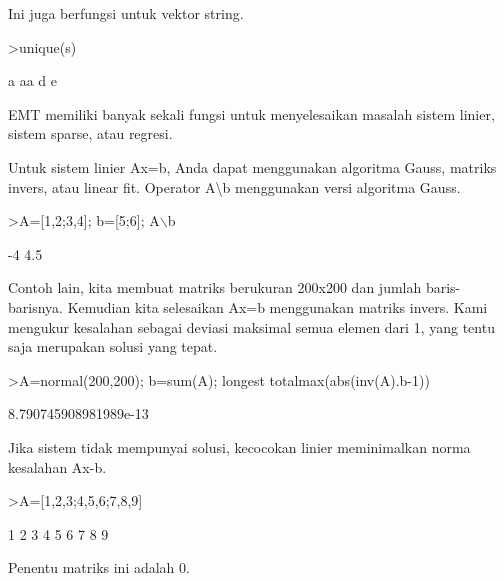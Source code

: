 \documentclass[a4paper,10pt]{article}
\begin{document}
\begin{eulernotebook}
\begin{eulercomment}
\begin{eulercomment}
\begin{eulercomment}
\begin{eulercomment}
\begin{eulercomment}
\begin{eulercomment}
\begin{eulercomment}
Ini juga berfungsi untuk vektor string.
\end{eulercomment}
\begin{eulerprompt}
>unique(s)
\end{eulerprompt}
\begin{euleroutput}
  a
  aa
  d
  e
\end{euleroutput}
\begin{eulercomment}
EMT memiliki banyak sekali fungsi untuk menyelesaikan masalah sistem
linier, sistem sparse, atau regresi.

Untuk sistem linier Ax=b, Anda dapat menggunakan algoritma Gauss,
matriks invers, atau linear fit. Operator A\textbackslash{}b menggunakan versi
algoritma Gauss.
\end{eulercomment}
\begin{eulerprompt}
>A=[1,2;3,4]; b=[5;6]; A\(\backslash\)b
\end{eulerprompt}
\begin{euleroutput}
             -4 
            4.5 
\end{euleroutput}
\begin{eulercomment}
Contoh lain, kita membuat matriks berukuran 200x200 dan jumlah
baris-barisnya. Kemudian kita selesaikan Ax=b menggunakan matriks
invers. Kami mengukur kesalahan sebagai deviasi maksimal semua elemen
dari 1, yang tentu saja merupakan solusi yang tepat.
\end{eulercomment}
\begin{eulerprompt}
>A=normal(200,200); b=sum(A); longest totalmax(abs(inv(A).b-1))
\end{eulerprompt}
\begin{euleroutput}
    8.790745908981989e-13 
\end{euleroutput}
\begin{eulercomment}
Jika sistem tidak mempunyai solusi, kecocokan linier meminimalkan
norma kesalahan Ax-b.
\end{eulercomment}
\begin{eulerprompt}
>A=[1,2,3;4,5,6;7,8,9]
\end{eulerprompt}
\begin{euleroutput}
              1             2             3 
              4             5             6 
              7             8             9 
\end{euleroutput}
\begin{eulercomment}
Penentu matriks ini adalah 0.
\end{eulercomment}
\begin{eulerprompt}

\end{eulerprompt}
\end{eulercomment}
\end{eulercomment}
\end{eulercomment}
\end{eulercomment}
\end{eulercomment}
\end{eulercomment}
\end{eulernotebook}
\end{document}
